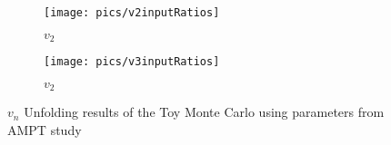 \begin{figure}[htp]
	\centering
	        \begin{subfigure}[b]{0.49\textwidth}
	        \centering
	\texttt{[image: pics/v2inputRatios]}
			\caption{$v_2$ }
	        	\label{fig:AMPTcheckv2}
           \end{subfigure}
           \hfill
           	        \begin{subfigure}[b]{0.49\textwidth}
	\texttt{[image: pics/v3inputRatios]}
			\caption{$v_2$ }
	        	\label{fig:AMPTcheckv3}
           \end{subfigure}
           
	\caption{$v_n$ Unfolding results of the Toy Monte Carlo using parameters from AMPT study}
	\label{fig:AMPTcheck}
	\end{figure}
